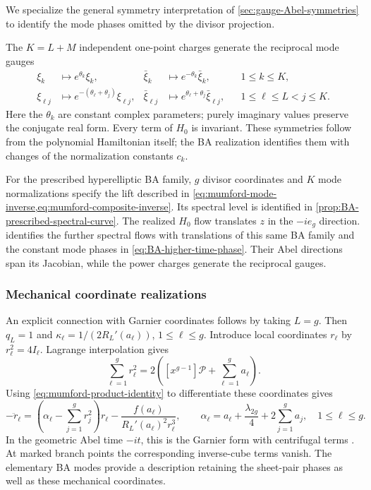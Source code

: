 We specialize the general symmetry interpretation of
\cref{sec:gauge-Abel-symmetries} to identify the mode phases omitted
by the divisor projection.

The $K=L+M$ independent one-point charges generate the reciprocal
mode gauges
\begin{equation}\label{eq:BA-gauge-action}
\begin{aligned}
 \xi_k&\longmapsto e^{\theta_k}\xi_k,&
 \bar{\xi}_k&\longmapsto e^{-\theta_k}\bar{\xi}_k,
 &&1\leq k\leq K,\\
 \xi_{\ell j}&\longmapsto e^{-(\theta_{\ell}+\theta_j)}\xi_{\ell j},&
 \bar{\xi}_{\ell j}&\longmapsto e^{\theta_{\ell}+\theta_j}\bar{\xi}_{\ell j},
 &&1\leq\ell\leq L<j\leq K.
\end{aligned}
\end{equation}
Here the $\theta_k$ are constant complex parameters; purely imaginary
values preserve the conjugate real form. Every term of $H_0$ is
invariant. These symmetries follow from the polynomial Hamiltonian
itself; the BA realization identifies them with changes of the
normalization constants $c_k$.

For the prescribed hyperelliptic BA family, $g$ divisor coordinates and
$K$ mode normalizations specify the lift described in
\cref{eq:mumford-mode-inverse,eq:mumford-composite-inverse}.
Its spectral level is identified in
\cref{prop:BA-prescribed-spectral-curve}. The realized $H_0$
flow translates $z$ in the $-ie_g$ direction.
 identifies the further spectral flows
with translations of this same BA family and the constant mode phases
in \cref{eq:BA-higher-time-phase}. Their Abel directions span its
Jacobian, while the power charges generate the reciprocal gauges.

\subsubsection{Mechanical coordinate realizations}

An explicit connection with Garnier coordinates follows by taking
$L=g$. Then $q_L=1$ and $\kappa_{\ell}=1/(2R_L'(a_{\ell}))$,
$1\leq\ell\leq g$. Introduce local coordinates $r_{\ell}$ by
$r_{\ell}^2=4I_{\ell}$. Lagrange interpolation gives
\begin{equation}\label{eq:mumford-garnier-potential}
 \sum_{\ell=1}^{g}r_{\ell}^2
 =2\left([x^{g-1}]\mathcal P+\sum_{\ell=1}^{g}a_{\ell}\right).
\end{equation}
Using \cref{eq:mumford-product-identity} to differentiate these
coordinates gives
\begin{equation}\label{eq:mumford-garnier}
 -\ddot r_{\ell}
 =\left(\alpha_{\ell}-\sum_{j=1}^{g}r_j^2\right)r_{\ell}
   -\frac{f(a_{\ell})}{R_L'(a_{\ell})^2r_{\ell}^3},\qquad
 \alpha_{\ell}=a_{\ell}+\frac{\lambda_{2g}}4+2\sum_{j=1}^{g}a_j,
 \quad1\leq\ell\leq g.
\end{equation}
In the geometric Abel time $-it$, this is the Garnier form with centrifugal terms
\cite{Kostov1999,Vanhaecke2001}. At marked branch points the
corresponding inverse-cube terms vanish. The elementary BA modes
provide a description retaining the sheet-pair phases as well as
these mechanical coordinates.

